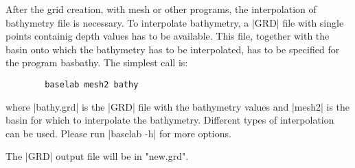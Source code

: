 

After the grid creation, with mesh or other programs, the interpolation
of bathymetry file is necessary.
To interpolate bathymetry, a |GRD| file with single points containig
depth values has to be available. This file, together with the basin
onto which the bathymetry has to be interpolated, has to be specified
for the program basbathy. The simplest call is: 

\begin{verbatim}
        baselab mesh2 bathy
\end{verbatim}

where |bathy.grd| is the |GRD| file with the bathymetry values and
|mesh2| is the basin for which to interpolate the bathymetry.
Different types of interpolation can be used. Please run
|baselab -h| for more options.

The |GRD| output file will be in "new.grd".



%


